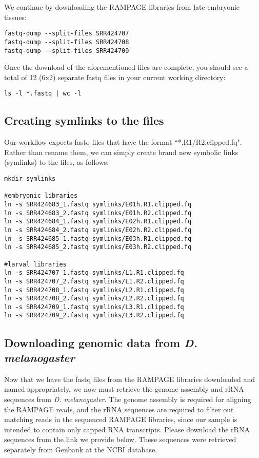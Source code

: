 \documentclass[runningheads,a4paper]{llncs}
\begin{document}
\begin{linenumbers}
\begin{itemize}
We continue by downloading the RAMPAGE libraries from late embryonic tissues:

\noindent
\begin{verbatim}
fastq-dump --split-files SRR424707
fastq-dump --split-files SRR424708
fastq-dump --split-files SRR424709
\end{verbatim}  

Once the download of the aforementioned files are complete, you should see a total of 12 (6x2) separate fastq files in your current working directory:

\noindent
\begin{verbatim}
ls -l *.fastq | wc -l
\end{verbatim}

\subsection{Creating symlinks to the files}
Our workflow expects fastq files that have the format ``*.R1/R2.clipped.fq". 
Rather than rename them, we can simply create brand new symbolic links (symlinks) to the files, as follows:

\noindent
\begin{verbatim}
mkdir symlinks

#embryonic libraries
ln -s SRR424683_1.fastq symlinks/E01h.R1.clipped.fq 
ln -s SRR424683_2.fastq symlinks/E01h.R2.clipped.fq
ln -s SRR424684_1.fastq symlinks/E02h.R1.clipped.fq
ln -s SRR424684_2.fastq symlinks/E02h.R2.clipped.fq
ln -s SRR424685_1.fastq symlinks/E03h.R1.clipped.fq
ln -s SRR424685_2.fastq symlinks/E03h.R2.clipped.fq

#larval libraries
ln -s SRR424707_1.fastq symlinks/L1.R1.clipped.fq 
ln -s SRR424707_2.fastq symlinks/L1.R2.clipped.fq
ln -s SRR424708_1.fastq symlinks/L2.R1.clipped.fq
ln -s SRR424708_2.fastq symlinks/L2.R2.clipped.fq
ln -s SRR424709_1.fastq symlinks/L3.R1.clipped.fq
ln -s SRR424709_2.fastq symlinks/L3.R2.clipped.fq
\end{verbatim}

\subsection{Downloading genomic data from \textit{D. melanogaster}}
Now that we have the fastq files from the RAMPAGE libraries downloaded and named appropriately, we now must retrieve the genome assembly and rRNA sequences from \textit{D. melanogaster}.
The genome assembly is required for aligning the RAMPAGE reads, and the rRNA sequences are required to filter out matching reads in the sequenced RAMPAGE libraries, since our sample is intended to contain only capped RNA transcripts. 
Please download the rRNA sequences from the link we provide below. 
These sequences were retrieved separately from Genbank at the NCBI database.


\end{itemize}
\end{linenumbers}
\end{document}
